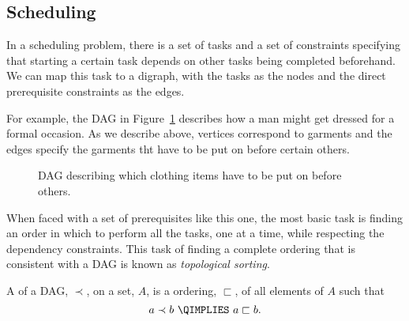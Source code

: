 \subsection{Scheduling}\label{sched_subsec}

In a scheduling problem, there is a set of tasks and a set of
constraints specifying that starting a certain task depends on other
tasks being completed beforehand.  We can map this task to a digraph,
with the tasks as the nodes and the direct prerequisite constraints as
the edges.

For example, the DAG in Figure~\ref{fig:7FP} describes how a man might
get dressed for a formal occasion.  As we describe above, vertices
correspond to garments and the edges specify the garments tht have to be
put on before certain others.

\begin{figure}


\caption{DAG describing which clothing items have to be put on before others.}

\label{fig:7FP}

\end{figure}

When faced with a set of prerequisites like this one, the most basic
task is finding an order in which to perform all the tasks, one at a
time, while respecting the dependency constraints.  This task of
finding a complete ordering that is consistent with a DAG is known as
\emph{topological sorting}.

\begin{editingnotes}

\begin{definition}
  A  of a DAG, $\prec$, on a set, $A$, is
  a ordering, $\sqsubset$, of all elements of $A$ such that
\[
a \prec b\ \QIMPLIES\  a \sqsubset b.
\]
\end{definition}

\end{editingnotes}

